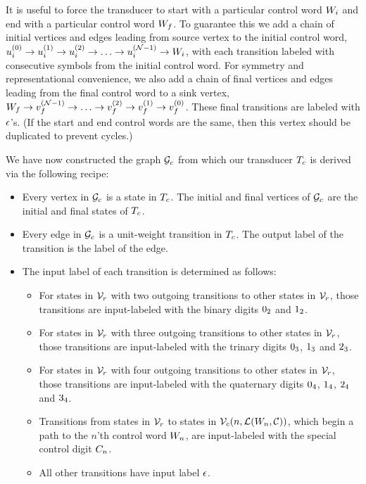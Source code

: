 \documentclass[english]{article}
\begin{document}
It is useful to force the transducer to start with a particular control word $W_i$
and end with a particular control word $W_f$.
To guarantee this we add a chain of initial vertices and edges leading from source vertex to the initial control word,
$u^{(0)}_i \to u^{(1)}_i \to u^{(2)}_i \to \ldots \to u^{({\cal N}-1)}_i \to W_i$,
with each transition labeled with consecutive symbols from the initial control word.
For symmetry and representational convenience, we also add a chain of final vertices and edges leading
from the final control word to a sink vertex,
$W_f \to v^{({\cal N}-1)}_f \to \ldots \to v^{(2)}_f \to v^{(1)}_f \to v^{(0)}_f$.
These final transitions are labeled with $\epsilon$'s.
(If the start and end control words are the same, then this vertex should be duplicated to prevent cycles.)

We have now constructed the graph ${\cal G}_c$ from which our transducer $T_c$
is derived via the following recipe:
\begin{itemize}
\item Every vertex in ${\cal G}_c$ is a state in $T_c$.
The initial and final vertices of ${\cal G}_c$ are the initial and final states of $T_c$.
\item Every edge in ${\cal G}_c$ is a unit-weight transition in $T_c$.
The output label of the transition is the label of the edge.
\item The input label of each transition is determined as follows:
\begin{itemize}
\item For states in ${\cal V}_r$ with two outgoing transitions to other states in ${\cal V}_r$, those transitions are input-labeled with the binary digits $0_2$ and $1_2$.
\item For states in ${\cal V}_r$ with three outgoing transitions to other states in ${\cal V}_r$, those transitions are input-labeled with the trinary digits $0_3$, $1_3$ and $2_3$.
\item For states in ${\cal V}_r$ with four outgoing transitions to other states in ${\cal V}_r$, those transitions are input-labeled with the quaternary digits $0_4$, $1_4$, $2_4$ and $3_4$.
\item Transitions from states in ${\cal V}_r$ to states in ${\cal V}_c(n,{\cal L}(W_n,{\cal C}))$,
which begin a path to the $n$'th control word $W_n$,
are input-labeled with the special control digit $C_{n}$.
\item All other transitions have input label $\epsilon$.
\end{itemize}
\end{itemize}
\end{document}
